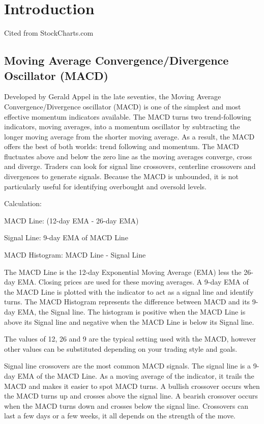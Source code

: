 \section{Introduction}
Cited from StockCharts.com

\subsection{Moving Average Convergence/Divergence Oscillator (MACD)}
Developed by Gerald Appel in the late seventies, the Moving Average Convergence/Divergence oscillator (MACD) is one of the simplest and most effective momentum indicators available. The MACD turns two trend-following indicators, moving averages, into a momentum oscillator by subtracting the longer moving average from the shorter moving average. As a result, the MACD offers the best of both worlds: trend following and momentum. The MACD fluctuates above and below the zero line as the moving averages converge, cross and diverge. Traders can look for signal line crossovers, centerline crossovers and divergences to generate signals. Because the MACD is unbounded, it is not particularly useful for identifying overbought and oversold levels.

Calculation:

MACD Line: (12-day EMA - 26-day EMA)

Signal Line: 9-day EMA of MACD Line

MACD Histogram: MACD Line - Signal Line

The MACD Line is the 12-day Exponential Moving Average (EMA) less the 26-day EMA. Closing prices are used for these moving averages. A 9-day EMA of the MACD Line is plotted with the indicator to act as a signal line and identify turns. The MACD Histogram represents the difference between MACD and its 9-day EMA, the Signal line. The histogram is positive when the MACD Line is above its Signal line and negative when the MACD Line is below its Signal line.

The values of 12, 26 and 9 are the typical setting used with the MACD, however other values can be substituted depending on your trading style and goals.

Signal line crossovers are the most common MACD signals. The signal line is a 9-day EMA of the MACD Line. As a moving average of the indicator, it trails the MACD and makes it easier to spot MACD turns. A bullish crossover occurs when the MACD turns up and crosses above the signal line. A bearish crossover occurs when the MACD turns down and crosses below the signal line. Crossovers can last a few days or a few weeks, it all depends on the strength of the move.

